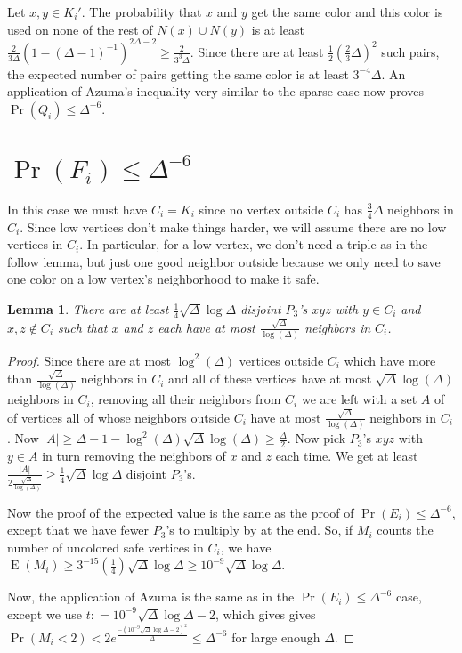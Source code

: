 \documentclass[12pt]{article}
\theoremstyle{plain}
\newtheorem{lem}[thm]{Lemma}
\theoremstyle{definition}
\theoremstyle{remark}
\newcommand{\card}[1]{\left|#1\right|}
\newcommand{\DefinedAs}{\mathrel{\mathop:}=}
\newcommand{\ex}{\operatorname{E}}
\begin{document}
Let $x, y \in K_i'$.  The probability that $x$ and $y$ get the same color and
this color is used on none of the rest of $N(x) \cup N(y)$ is at least
$\frac{2}{3\Delta}(1 - (\Delta-1)^{-1})^{2\Delta - 2} \geq \frac{2}{3^3\Delta}$.
Since there are at least $\frac12 (\frac23 \Delta)^2$ such pairs, the expected
number of pairs getting the same color is at least $3^{-4}\Delta$.  An
application of Azuma's inequality very similar to the sparse case now proves
$\Pr(Q_i) \leq \Delta^{-6}$.

\section{$\Pr(F_i) \leq \Delta^{-6}$}
In this case we must have $C_i = K_i$ since no vertex outside $C_i$ has
$\frac34 \Delta$ neighbors in $C_i$.  Since low vertices don't make things
harder, we will assume there are no low vertices in $C_i$.  In particular, for a
low vertex, we don't need a triple as in the follow lemma, but just one good neighbor outside because we only need to save one color on a low
vertex's neighborhood to make it safe.

\begin{lem}\label{triplesAgain}
There are at least $\frac14 \sqrt{\Delta}\log{\Delta}$ disjoint $P_3$'s $xyz$
with $y \in C_i$ and $x, z \not \in C_i$ such that $x$ and $z$ each have at most
$\frac{\sqrt{\Delta}}{\log(\Delta)}$ neighbors in $C_i$.
\end{lem}
\begin{proof}
Since there are at most $\log^2(\Delta)$ vertices outside $C_i$ which have more
than $\frac{\sqrt{\Delta}}{\log(\Delta)}$ neighbors in $C_i$ and all of these
vertices have at most $\sqrt{\Delta}\log(\Delta)$ neighbors in $C_i$, removing
all their neighbors from $C_i$ we are left with a set $A$ of of vertices all of
whose neighbors outside $C_i$ have at most $\frac{\sqrt{\Delta}}{\log(\Delta)}$
neighbors in $C_i$.  Now $\card{A} \geq \Delta - 1 -
\log^2(\Delta)\sqrt{\Delta}\log(\Delta) \geq \frac{\Delta}{2}$.  Now pick
$P_3$'s $xyz$ with $y \in A$ in turn removing the neighbors of $x$ and $z$ each
time.  We get at least $\frac{\card{A}}{2\frac{\sqrt{\Delta}}{\log(\Delta)}}
\geq \frac14 \sqrt{\Delta}\log{\Delta}$ disjoint $P_3$'s.

Now the proof of the expected value is the same as the proof of $\Pr(E_i) \leq
\Delta^{-6}$, except that we have fewer $P_3$'s to multiply by at the end.  So,
if $M_i$ counts the number of uncolored safe vertices in $C_i$, we have
$\ex(M_i) \geq 3^{-15} (\frac14) \sqrt{\Delta}\log{\Delta} \geq 10^{-9}
\sqrt{\Delta}\log{\Delta}$.

Now, the application of Azuma is the same as in the $\Pr(E_i) \leq
\Delta^{-6}$ case, except we use $t \DefinedAs 10^{-9}
\sqrt{\Delta}\log{\Delta} - 2$, which gives gives $\Pr(M_i < 2) <
2e^{\frac{-(10^{-9} \sqrt{\Delta}\log{\Delta} - 2)^2}{\Delta}} \leq
\Delta^{-6}$ for large enough $\Delta$.
\end{proof}
\end{document}
